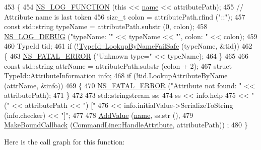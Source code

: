 \begin{DoxyCode}
453 \{
454   \hyperlink{log-macros-disabled_8h_a90b90d5bad1f39cb1b64923ea94c0761}{NS\_LOG\_FUNCTION} (\textcolor{keyword}{this} << \hyperlink{generate__test__data__lte__spectrum__model_8m_ab74e6bf80237ddc4109968cedc58c151}{name} << attributePath);
455   \textcolor{comment}{// Attribute name is last token}
456   \textcolor{keywordtype}{size\_t} colon = attributePath.rfind (\textcolor{stringliteral}{"::"});
457   \textcolor{keyword}{const} std::string typeName = attributePath.substr (0, colon);
458   \hyperlink{group__logging_ga413f1886406d49f59a6a0a89b77b4d0a}{NS\_LOG\_DEBUG} (\textcolor{stringliteral}{"typeName: '"} << typeName << \textcolor{stringliteral}{"', colon: "} << colon);
459   
460   TypeId tid;
461   \textcolor{keywordflow}{if} (!\hyperlink{classns3_1_1TypeId_acceab1f57bfe3c3af02130277d409f14}{TypeId::LookupByNameFailSafe} (typeName, &tid))
462     \{
463       \hyperlink{group__fatal_ga5131d5e3f75d7d4cbfd706ac456fdc85}{NS\_FATAL\_ERROR} (\textcolor{stringliteral}{"Unknown type="} << typeName);
464     \}
465 
466   \textcolor{keyword}{const} std::string attrName = attributePath.substr (colon + 2);
467   \textcolor{keyword}{struct }TypeId::AttributeInformation info;  
468   \textcolor{keywordflow}{if} (!tid.LookupAttributeByName (attrName, &info))
469     \{
470       \hyperlink{group__fatal_ga5131d5e3f75d7d4cbfd706ac456fdc85}{NS\_FATAL\_ERROR} (\textcolor{stringliteral}{"Attribute not found: "} << attributePath);
471     \}
472       
473   std::stringstream ss;
474   ss << info.help
475      << \textcolor{stringliteral}{" ("} << attributePath << \textcolor{stringliteral}{") ["}
476      << info.initialValue->SerializeToString (info.checker) << \textcolor{stringliteral}{"]"};
477   
478   \hyperlink{classns3_1_1CommandLine_addcfb546c7ad4c8bd0965654d55beb8e}{AddValue} (\hyperlink{generate__test__data__lte__spectrum__model_8m_ab74e6bf80237ddc4109968cedc58c151}{name}, ss.str (),
479             \hyperlink{group__makeboundcallback_ga1725d6362e6065faa0709f7c93f8d770}{MakeBoundCallback} (\hyperlink{classns3_1_1CommandLine_af1fea2680a68a10ce801b1700d0b8693}{CommandLine::HandleAttribute}, 
      attributePath)) ;
480 \}
\end{DoxyCode}


Here is the call graph for this function\+:


